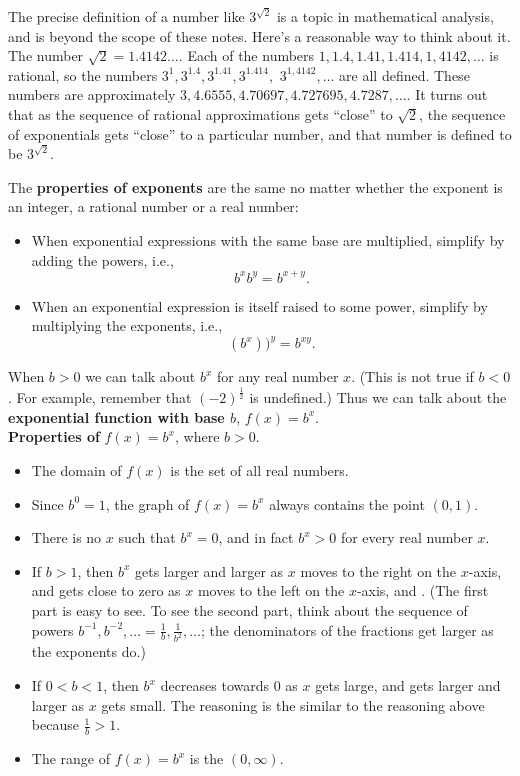 \documentclass[11pt]{book}               %
\begin{document}
The precise definition of a number like $3^{\sqrt{2}}$ is a topic in mathematical analysis, and is beyond
the scope of these notes.  Here's a reasonable way to think about it.
The number $\sqrt{2} = 1.4142\ldots$.
Each of the numbers $1, 1.4, 1.41, 1.414, 1,4142, \ldots$ is rational, so the numbers
$3^1, 3^{1.4}, 3^{1.41}, 3^{1.414}, $ $3^{1,4142}, \ldots$ are all defined.
These numbers are approximately $3, 4.6555, 4.70697, 4.727695, 4.7287, \ldots$.
It turns out that as the sequence of rational approximations gets ``close'' to $\sqrt{2}$,
the sequence of exponentials gets ``close'' to a particular number, and that number is
defined to be $3^{\sqrt{2}}$.

The \textbf{properties of exponents} are the same no matter whether the exponent is an integer, a rational number or a real number:
\begin{itemize}
\item When exponential expressions with the same base are multiplied, simplify by adding the powers, i.e.,
$$b^xb^y = b^{x+y}.$$
\item When an exponential expression is itself raised to some power, simplify by multiplying the exponents, i.e., 
$$\left(b^x\right))^y = b^{xy}.$$
\end{itemize}

When $b > 0$ we can talk about $b^x$ for any real number $x$.  (This is not true if $b < 0$. For example, remember that $(-2)^{\frac{1}{2}}$ is undefined.)
Thus we can talk about the \textbf{exponential function with base $b$},  $f(x) = b^x$.\\


\noindent
\textbf{Properties of} $f(x)=b^x$, where $b>0$.
\begin{itemize}
\item The domain of $f(x)$ is the set of all real numbers.
\item Since $b^0 = 1$, the graph of $f(x)=b^x$ always contains the point $(0, 1)$.
\item There is no $x$ such that $b^x = 0$, and in fact $b^x > 0$ for every real number $x$.
\item If $b > 1$, then $b^x$ gets larger and larger as $x$ moves to the right on the $x$-axis, and
gets close to zero as $x$ moves to the left on the $x$-axis, and .  (The first part is easy to see.  To see the second part, think about the sequence of powers $b^{-1}, b^{-2}, \ldots = \frac{1}{b}, \frac{1}{b^2}, \ldots$;  the denominators  of the fractions get larger as the exponents do.) 
\item If $0 < b < 1$, then $b^x$ decreases towards 0 
as $x$ gets large, and gets larger and larger as $x$ gets small.  The reasoning is the similar
to the reasoning above because $\frac{1}{b} > 1$.
\item The range of $f(x) = b^x$ is the $(0, \infty)$.
\end{itemize}
\end{document}
